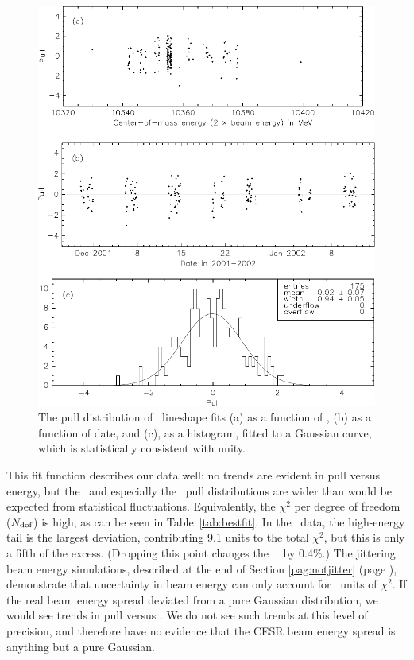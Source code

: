 \documentclass{cornell}
\begin{document}
\begin{figure}[p]
  \begin{center}
    \includegraphics[width=\linewidth]{plots/pullsthree}
  \end{center}
  \caption{\label{pullsthree} The pull distribution of \usss\
  lineshape fits (a) as a function of \ecm, (b) as a function of date,
  and (c), as a histogram, fitted to a Gaussian curve, which is
  statistically consistent with unity.}
\end{figure}

This fit function describes our data well: no trends are evident in
pull versus energy, but the \us\ and especially the \uss\ pull
distributions are wider than would be expected from statistical
fluctuations.  Equivalently, the $\chi^2$ per degree of freedom
($N_{\mbox{\scriptsize dof}}$) is high, as can be seen in Table~\ref{tab:bestfit}.
In the \uss\ data, the high-energy tail is the largest deviation,
contributing 9.1 units to the total $\chi^2$, but this is only a fifth
of the excess.  (Dropping this point changes the \uss\ \geehadtot\ by
0.4\%.)  The jittering beam energy simulations, described at the end
of Section \ref{pag:notjitter} (page \pageref{pag:notjitter}),
demonstrate that uncertainty in beam energy can only account for
\bork\ units of $\chi^2$.  If the real beam energy spread deviated
from a pure Gaussian distribution, we would see trends in pull versus
\ecm.  We do not see such trends at this level of precision, and
therefore have no evidence that the CESR beam energy spread is
anything but a pure Gaussian.
\end{document}
